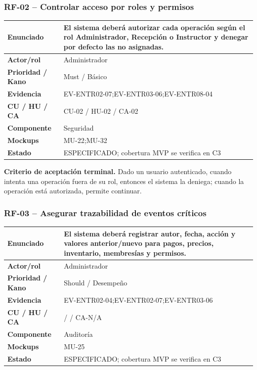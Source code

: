 \documentclass[11pt,a4paper,twoside]{article}
\begin{document}
\subsubsection{RF-02 -- Controlar acceso por roles y permisos}
\begin{tabularx}{\textwidth}{|>{\bfseries}p{3.2cm}|X|}\hline
Enunciado & El sistema deberá autorizar cada operación según el rol Administrador, Recepción o Instructor y denegar por defecto las no asignadas. \\ \hline
Actor/rol & Administrador \\ \hline
Prioridad / Kano & Must / Básico \\ \hline
Evidencia & EV-ENTR02-07;EV-ENTR03-06;EV-ENTR08-04 \\ \hline
CU / HU / CA & CU-02 / HU-02 / CA-02 \\ \hline
Componente & Seguridad \\ \hline
Mockups & MU-22;MU-32 \\ \hline
Estado & ESPECIFICADO; cobertura MVP se verifica en C3 \\ \hline
\end{tabularx}
\textbf{Criterio de aceptación terminal.} Dado un usuario autenticado, cuando intenta una operación fuera de su rol, entonces el sistema la deniega; cuando la operación está autorizada, permite continuar.
\subsubsection{RF-03 -- Asegurar trazabilidad de eventos críticos}
\begin{tabularx}{\textwidth}{|>{\bfseries}p{3.2cm}|X|}\hline
Enunciado & El sistema deberá registrar autor, fecha, acción y valores anterior/nuevo para pagos, precios, inventario, membresías y permisos. \\ \hline
Actor/rol & Administrador \\ \hline
Prioridad / Kano & Should / Desempeño \\ \hline
Evidencia & EV-ENTR02-04;EV-ENTR02-07;EV-ENTR03-06 \\ \hline
CU / HU / CA &  /  / CA-N/A \\ \hline
Componente & Auditoría \\ \hline
Mockups & MU-25 \\ \hline
Estado & ESPECIFICADO; cobertura MVP se verifica en C3 \\ \hline
\end{tabularx}
\end{document}
